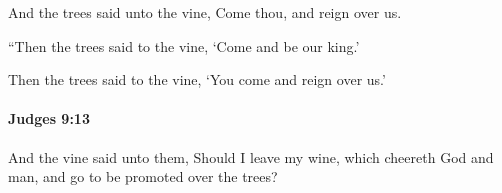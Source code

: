 			\begin{versebox}
					\item[BHS] 
					\item[ASV] And the trees said unto the vine, Come thou, and reign over us.
					\item[NIV] “Then the trees said to the vine, ‘Come and be our king.’
					\item[NRSV] Then the trees said to the vine, ‘You come and reign over us.’
			\end{versebox}

		\paragraph{Judges 9:13} %
			\label{JUDGES-9-13}

			And the vine said unto them, Should I leave my wine, which cheereth God and man, and go to be promoted over the trees?

